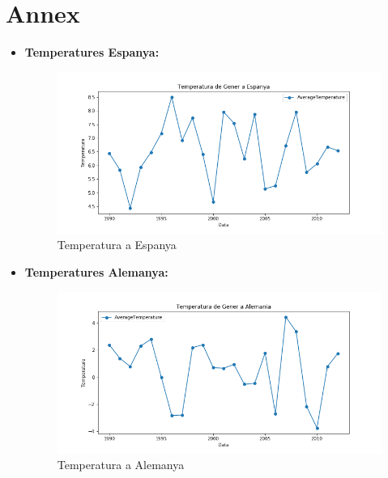 \documentclass[10pt,a4paper,twocolumn,twoside]{article}
\begin{document}
\section{Annex}
 \begin{itemize}
\item \textbf{Temperatures Espanya:}
\begin{figure}[!h]
\centering
	\includegraphics[width=1\textwidth]{../img/tempSpain}
	\caption{Temperatura a Espanya}
	\label{fig-tempSpain}
\end{figure}
\item \textbf{Temperatures Alemanya:}
\begin{figure}[!h]
\centering
	\includegraphics[width=1\textwidth]{../img/tempGermany}
	\caption{Temperatura a Alemanya}
	\label{fig-tempGerm}
\end{figure}
\end{itemize}
\end{document}
